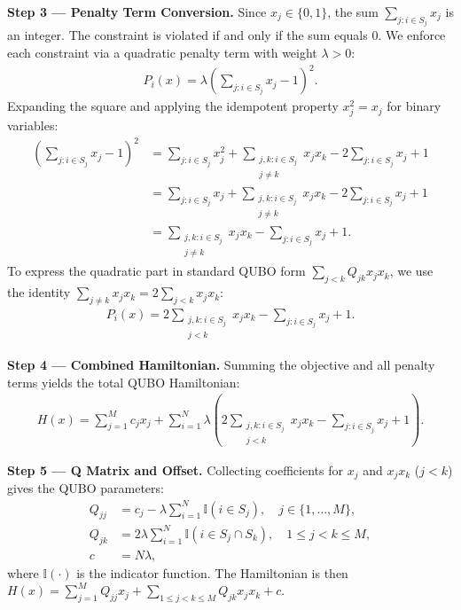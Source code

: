 \documentclass[12pt]{article}
\begin{document}
\textbf{Step 3 --- Penalty Term Conversion.} Since $x_j \in \{0,1\}$, the sum $\sum_{j: i \in S_j} x_j$ is an integer. The constraint is violated if and only if the sum equals $0$. We enforce each constraint via a quadratic penalty term with weight $\lambda > 0$:
\begin{align}
P_i(x) = \lambda \left( \sum_{j: i \in S_j} x_j - 1 \right)^2.
\end{align}
Expanding the square and applying the idempotent property $x_j^2 = x_j$ for binary variables:
\begin{align}
\left( \sum_{j: i \in S_j} x_j - 1 \right)^2 &= \sum_{j: i \in S_j} x_j^2 + \sum_{\substack{j,k: i \in S_j \\ j \neq k}} x_j x_k - 2 \sum_{j: i \in S_j} x_j + 1 \nonumber \\
&= \sum_{j: i \in S_j} x_j + \sum_{\substack{j,k: i \in S_j \\ j \neq k}} x_j x_k - 2 \sum_{j: i \in S_j} x_j + 1 \nonumber \\
&= \sum_{\substack{j,k: i \in S_j \\ j \neq k}} x_j x_k - \sum_{j: i \in S_j} x_j + 1.
\end{align}
To express the quadratic part in standard QUBO form $\sum_{j < k} Q_{jk} x_j x_k$, we use the identity $\sum_{j \neq k} x_j x_k = 2 \sum_{j < k} x_j x_k$:
\begin{align}
P_i(x) = 2 \sum_{\substack{j,k: i \in S_j \\ j < k}} x_j x_k - \sum_{j: i \in S_j} x_j + 1.
\end{align}

\textbf{Step 4 --- Combined Hamiltonian.} Summing the objective and all penalty terms yields the total QUBO Hamiltonian:
\begin{align}
H(x) = \sum_{j=1}^M c_j x_j + \sum_{i=1}^N \lambda \left( 2 \sum_{\substack{j,k: i \in S_j \\ j < k}} x_j x_k - \sum_{j: i \in S_j} x_j + 1 \right).
\end{align}

\textbf{Step 5 --- Q Matrix and Offset.} Collecting coefficients for $x_j$ and $x_j x_k$ ($j < k$) gives the QUBO parameters:
\begin{align}
Q_{jj} &= c_j - \lambda \sum_{i=1}^N \mathbb{I}(i \in S_j), \quad j \in \{1, \dots, M\}, \nonumber \\
Q_{jk} &= 2\lambda \sum_{i=1}^N \mathbb{I}(i \in S_j \cap S_k), \quad 1 \le j < k \le M, \nonumber \\
c &= N \lambda,
\end{align}
where $\mathbb{I}(\cdot)$ is the indicator function. The Hamiltonian is then $H(x) = \sum_{j=1}^M Q_{jj} x_j + \sum_{1 \le j < k \le M} Q_{jk} x_j x_k + c$.
\end{document}
